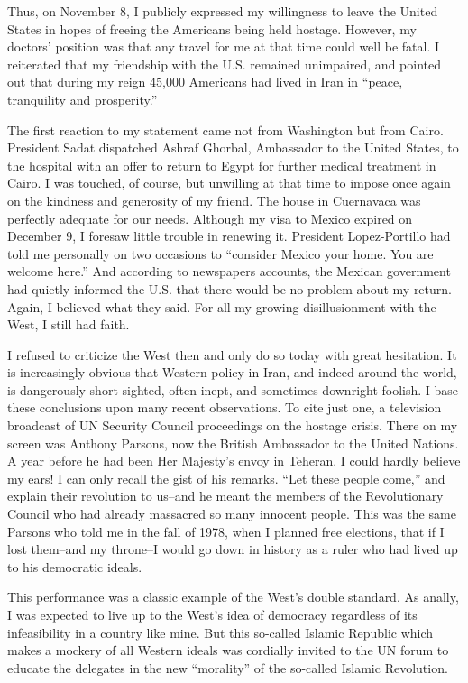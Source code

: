 Thus, on November 8, I publicly expressed my willingness to leave the United States in hopes of freeing the Americans being held hostage. However, my doctors’ position was that any travel for me at that time could well be fatal. I reiterated that my friendship with the U.S. remained unimpaired, and pointed out that during my reign 45,000 Americans had lived in Iran in “peace, tranquility and prosperity.” 

The first reaction to my statement came not from Washington but from Cairo. President Sadat dispatched Ashraf Ghorbal, Ambassador to the United States, to the hospital with an offer to return to Egypt for further medical treatment in Cairo. I was touched, of course, but unwilling at that time to impose once again on the kindness and generosity of my friend. The house in Cuernavaca was perfectly adequate for our needs. Although my visa to Mexico expired on December 9, I foresaw little trouble in renewing it. President Lopez-Portillo had told me personally on two occasions to “consider Mexico your home. You are welcome here.” And according to newspapers accounts, the Mexican government had quietly informed the U.S. that there would be no problem about my return. Again, I believed what they said. For all my growing disillusionment with the West, I still had faith. 

I refused to criticize the West then and only do so today with great hesitation. It is increasingly obvious that Western policy in Iran, and indeed around the world, is dangerously short-sighted, often inept, and sometimes downright foolish. I base these conclusions upon many recent observations. To cite just one, a television broadcast of UN Security Council proceedings on the hostage crisis. There on my screen was Anthony Parsons, now the British Ambassador to the United Nations. A year before he had been Her Majesty's envoy in Teheran. I could hardly believe my ears! I can only recall the gist of his remarks. “Let these people come,” and explain their revolution to us--and he meant the members of the Revolutionary Council who had already massacred so many innocent people. This was the same Parsons who told me in the fall of 1978, when I planned free elections, that if I lost them--and my throne--I would go down in history as a ruler who had lived up to his democratic ideals. 

This performance was a classic example of the West's double standard. As anally, I was expected to live up to the West's idea of democracy regardless of its infeasibility in a country like mine. But this so-called Islamic Republic which makes a mockery of all Western ideals was cordially invited to the UN forum to educate the delegates in the new “morality” of the so-called Islamic Revolution. 

